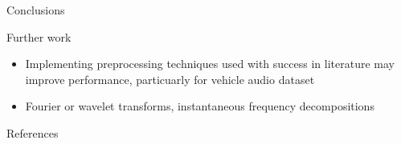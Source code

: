 \documentclass[final]{beamer}
\newlength{\onecolwid}
\begin{document}
\begin{frame}[t]
\begin{columns}[t]
\begin{column}{\onecolwid}
\begin{block}{Conclusions}

\end{block}


\begin{block}{Further work}
    \begin{itemize}
        \item Implementing preprocessing techniques used with success in literature may improve
            performance, particuarly for vehicle audio dataset
        \item Fourier or wavelet transforms, instantaneous frequency decompositions
            \cite{chui_signal_2016}
    \end{itemize}
\end{block}


\begin{block}{References}

\scriptsize{
\vspace{0.75in}}

\end{block}


\end{column}    %



\end{columns}
\end{frame}
\end{document}
